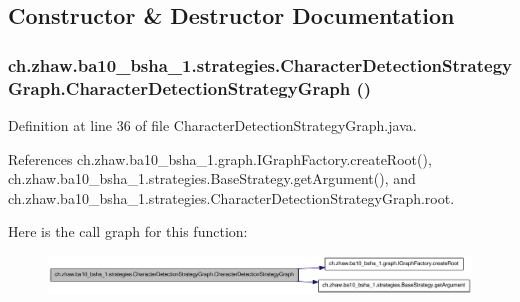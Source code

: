 \subsection{Constructor \& Destructor Documentation}
\hypertarget{classch_1_1zhaw_1_1ba10__bsha__1_1_1strategies_1_1CharacterDetectionStrategyGraph_aac7a339a3686ece943ad17ccc97bc901}{
\subsubsection[{CharacterDetectionStrategyGraph}]{\setlength{\rightskip}{0pt plus 5cm}ch.zhaw.ba10\_\-bsha\_\-1.strategies.CharacterDetectionStrategyGraph.CharacterDetectionStrategyGraph ()}}
\label{classch_1_1zhaw_1_1ba10__bsha__1_1_1strategies_1_1CharacterDetectionStrategyGraph_aac7a339a3686ece943ad17ccc97bc901}


Definition at line 36 of file CharacterDetectionStrategyGraph.java.

References ch.zhaw.ba10\_\-bsha\_\-1.graph.IGraphFactory.createRoot(), ch.zhaw.ba10\_\-bsha\_\-1.strategies.BaseStrategy.getArgument(), and ch.zhaw.ba10\_\-bsha\_\-1.strategies.CharacterDetectionStrategyGraph.root.

Here is the call graph for this function:\nopagebreak
\begin{figure}[H]
\begin{center}
\leavevmode
\includegraphics[width=409pt]{classch_1_1zhaw_1_1ba10__bsha__1_1_1strategies_1_1CharacterDetectionStrategyGraph_aac7a339a3686ece943ad17ccc97bc901_cgraph}
\end{center}
\end{figure}


